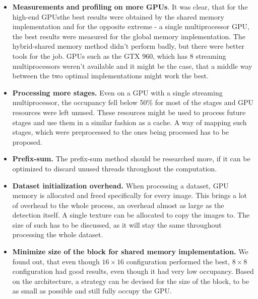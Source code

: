 \begin{itemize}
	\item \textbf{Measurements and profiling on more GPUs}. It was clear, that for the high-end GPUsthe best results were obtained by the shared memory implementation and for the opposite extreme - a single multiprocessor GPU, the best results were measured for the global memory implementation. The hybrid-shared memory method didn't perform badly, but there were better tools for the job. GPUs such as the GTX 960, which has 8 streaming multiprocessors weren't available and it might be the case, that a middle way between the two optimal implementations might work the best.
	\item \textbf{Processing more stages.} Even on a GPU with a single streaming multiprocessor, the occupancy fell below 50\% for most of the stages and GPU resources were left unused. These resources might be used to process future stages and use them in a similar fashion as a cache. A way of mapping such stages, which were preprocessed to the ones being processed has to be proposed.
	\item \textbf{Prefix-sum.} The prefix-sum method should be researched more, if it can be optimized to discard unused threads throughout the computation.
	\item \textbf{Dataset initialization overhead.} When processing a dataset, GPU memory is allocated and freed specifically for every image. This brings a lot of overhead to the whole process, an overhead almost as large as the detection itself. A single texture can be allocated to copy the images to. The size of such has to be discussed, as it will stay the same throughout processing the whole dataset.
	\item \textbf{Minimize size of the block for shared memory implementation.} We found out, that even though $16 \times 16$ configuration performed the best, $8 \times 8$ configuration had good results, even though it had very low occupancy. Based on the architecture, a strategy can be devised for the size of the block, to be as small as possible and still fully occupy the GPU.
\end{itemize}



\nocite{zemcik-high-performance}
\nocite{herout-realtime-cuda}
\nocite{warps-occupancy}
\nocite{memory-coalescing}
\nocite{gpu-opt-fundamentals}